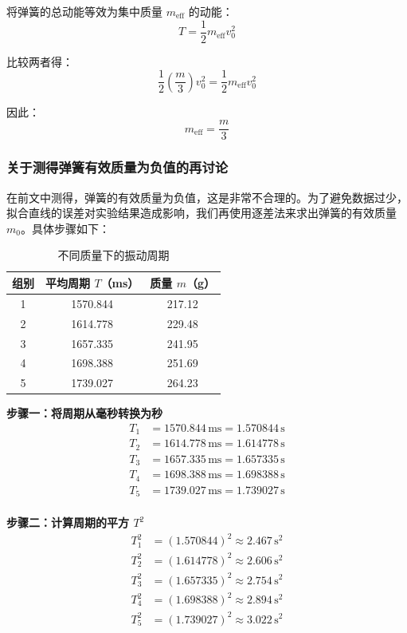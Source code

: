 \documentclass[zihao=5, UTF8]{article}
\theoremstyle{MyLineTheoremStyle} %
\theoremstyle{MyBlockTheoremStyle} %
\theoremstyle{MySubsubsectionStyle} %
\begin{document}
将弹簧的总动能等效为集中质量 $ m_{\text{eff}} $ 的动能：
$$
T = \frac{1}{2} m_{\text{eff}} v_0^2
$$

比较两者得：
$$
\frac{1}{2} \left( \frac{m}{3} \right) v_0^2 = \frac{1}{2} m_{\text{eff}} v_0^2
$$

因此：
$$
m_{\text{eff}} = \frac{m}{3}
$$

\subsubsection{关于测得弹簧有效质量为负值的再讨论}
在前文中测得，弹簧的有效质量为负值，这是非常不合理的。为了避免数据过少，拟合直线的误差对实验结果造成影响，我们再使用逐差法来求出弹簧的有效质量 \( m_0 \)。具体步骤如下：

\begin{table}[h]
  \centering
  \begin{tabular}{|c|c|c|}
    \hline
    组别 & 平均周期 \( T \)（ms） & 质量 \( m \)（g） \\
    \hline
    1 & 1570.844 & 217.12 \\
    \hline
    2 & 1614.778 & 229.48 \\
    \hline
    3 & 1657.335 & 241.95 \\
    \hline
    4 & 1698.388 & 251.69 \\
    \hline
    5 & 1739.027 & 264.23 \\
    \hline
  \end{tabular}
  \caption{不同质量下的振动周期}
\end{table}

\textbf{步骤一：将周期从毫秒转换为秒} \\
\[
\begin{aligned}
T_1 &= 1570.844 \, \text{ms} = 1.570844 \, \text{s} \\
T_2 &= 1614.778 \, \text{ms} = 1.614778 \, \text{s} \\
T_3 &= 1657.335 \, \text{ms} = 1.657335 \, \text{s} \\
T_4 &= 1698.388 \, \text{ms} = 1.698388 \, \text{s} \\
T_5 &= 1739.027 \, \text{ms} = 1.739027 \, \text{s} \\
\end{aligned}
\]

\textbf{步骤二：计算周期的平方 \( T^2 \)} \\
\[
\begin{aligned}
T_1^2 &= (1.570844)^2 \approx 2.467 \, \text{s}^2 \\
T_2^2 &= (1.614778)^2 \approx 2.606 \, \text{s}^2 \\
T_3^2 &= (1.657335)^2 \approx 2.754 \, \text{s}^2 \\
T_4^2 &= (1.698388)^2 \approx 2.894 \, \text{s}^2 \\
T_5^2 &= (1.739027)^2 \approx 3.022 \, \text{s}^2 \\
\end{aligned}
\]
\end{document}
